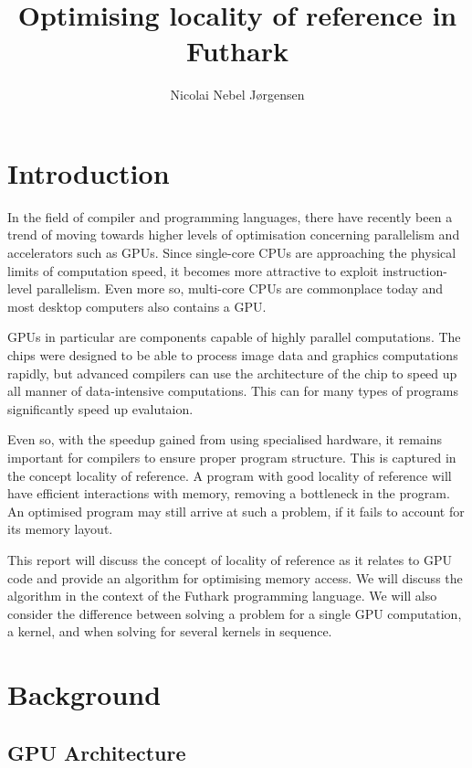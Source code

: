 \documentclass{article}
\begin{document}
\title{Optimising locality of reference in Futhark}
\author{Nicolai Nebel Jørgensen}

\maketitle

\newpage

\section{Introduction}

In the field of compiler and programming languages, there have recently been a trend of moving towards higher levels of optimisation concerning parallelism and
accelerators such as GPUs. Since single-core CPUs are approaching the physical limits of computation speed, it becomes more attractive to exploit
instruction-level parallelism. Even more so, multi-core CPUs are commonplace today and most desktop computers also contains a GPU.

GPUs in particular are components capable of highly parallel computations. The chips were designed to be able to process image data and graphics computations
rapidly, but advanced compilers can use the architecture of the chip to speed up all manner of data-intensive computations. This can for many types of programs
significantly speed up evalutaion.

Even so, with the speedup gained from using specialised hardware, it remains important for compilers to ensure proper program structure. This is captured in the
concept locality of reference. A program with good locality of reference will have efficient interactions with memory, removing a bottleneck in the program. An
optimised program may still arrive at such a problem, if it fails to account for its memory layout.

This report will discuss the concept of locality of reference as it relates to GPU code and provide an algorithm for optimising memory access. We will discuss
the algorithm in the context of the Futhark programming language.  We will also consider the difference between solving a problem for a single GPU computation,
a kernel, and when solving for several kernels in sequence.

\section{Background}

\subsection{GPU Architecture}
\end{document}
